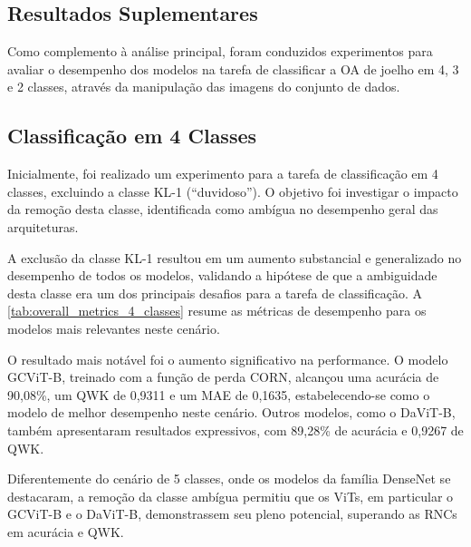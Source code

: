 
\begin{apendicesenv}

\partapendices

\chapter{Resultados Suplementares}

Como complemento à análise principal, foram conduzidos experimentos para avaliar o desempenho dos modelos na tarefa de classificar a OA de joelho em 4, 3 e 2 classes, através da manipulação das imagens do conjunto de dados.

\section{Classificação em 4 Classes}
\label{apendice:resultados_4_classes}

Inicialmente, foi realizado um experimento para a tarefa de classificação em 4 classes, excluindo a classe KL-1 (``duvidoso''). O objetivo foi investigar o impacto da remoção desta classe, identificada como ambígua no desempenho geral das arquiteturas.

A exclusão da classe KL-1 resultou em um aumento substancial e generalizado no desempenho de todos os modelos, validando a hipótese de que a ambiguidade desta classe era um dos principais desafios para a tarefa de classificação. A \autoref{tab:overall_metrics_4_classes} resume as métricas de desempenho para os modelos mais relevantes neste cenário.

O resultado mais notável foi o aumento significativo na performance. O modelo GCViT-B, treinado com a função de perda CORN, alcançou uma acurácia de 90,08\%, um QWK de 0,9311 e um MAE de 0,1635, estabelecendo-se como o modelo de melhor desempenho neste cenário. Outros modelos, como o DaViT-B, também apresentaram resultados expressivos, com 89,28\% de acurácia e 0,9267 de QWK.

Diferentemente do cenário de 5 classes, onde os modelos da família DenseNet se destacaram, a remoção da classe ambígua permitiu que os ViTs, em particular o GCViT-B e o DaViT-B, demonstrassem seu pleno potencial, superando as RNCs em acurácia e QWK.


\end{apendicesenv}
